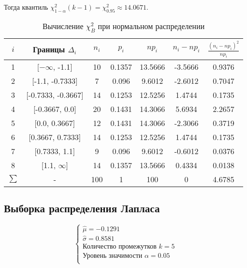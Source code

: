\documentclass[12pt,a4paper]{article}
\begin{document}
Тогда квантиль $\chi^2_{1-\alpha}(k-1)=\chi^2_{0.95}\approx14.0671$. 
\begin{table}[H]
    \centering
    \begin{tabular}{|c|c|c|c|c|c|c|}
    \hline
    $i$ & Границы $\Delta_i$ & $n_i$ & $p_i$ & $np_i$ & $n_i-np_i$ & $\frac{(n_i-np_i)^2}{np_i}$\\\hline\hline
    1 & [$-\infty$, -1.1] & 10 & 0.1357 & 13.5666 & -3.5666 & 0.9376\\\hline
    2 & [-1.1, -0.7333] & 7 & 0.096 & 9.6012 & -2.6012 & 0.7047\\\hline
    3 & [-0.7333, -0.3667] & 14 & 0.1253 & 12.5256 & 1.4744 & 0.1735\\\hline
    4 & [-0.3667, 0.0] & 20 & 0.1431 & 14.3066 & 5.6934 & 2.2657\\\hline
    5 & [0.0, 0.3667] & 12 & 0.1431 & 14.3066 & -2.3066 & 0.3719\\\hline
    6 & [0.3667, 0.7333] & 14 & 0.1253 & 12.5256 & 1.4744 & 0.1735\\\hline
    7 & [0.7333, 1.1] & 9 & 0.096 & 9.6012 & -0.6012 & 0.0376\\\hline
    8 & [1.1, $\infty$] & 14 & 0.1357 & 13.5666 & 0.4334 & 0.0138\\\hline
    $\sum$ & - & 100 & 1 & 100 & 0 & 4.6785\\\hline
    \end{tabular}
    \caption{Вычисление $\chi^2_B$ при нормальном распределении}
\end{table}

\subsection{Выборка распределения Лапласа}
\begin{equation}
    \left\{
    \begin{array}{ll}
        \hat{\mu}=-0.1291\\
        \hat{\sigma}=0.8581\\
        \text{Количество промежутков }k=5\\
        \text{Уровень значимости }\alpha=0.05\\
    \end{array}
    \right.
\end{equation}
\end{document}
